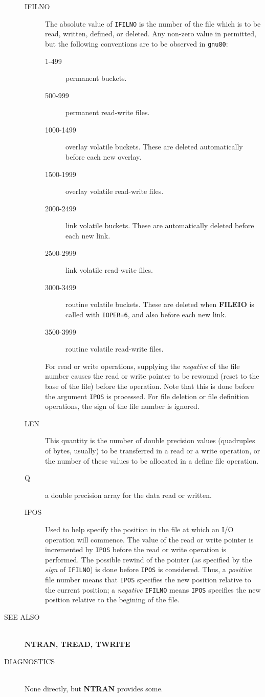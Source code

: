 \begin{description}
\begin{description}
\item[IFILNO] The absolute value of {\tt IFILNO} is the number  of  the  file
which is to be read, written, defined, or deleted.  Any
non-zero value in permitted, but the following  
conventions are to be observed in {\tt gnu80}:
\begin{description} 
\item[1-499]  permanent buckets.
\item[500-999] permanent read-write files.
\item[1000-1499]  overlay volatile buckets.  These are  
deleted automatically before each new overlay.
\item[1500-1999]  overlay volatile read-write files.
\item[2000-2499]  link volatile buckets.  These  are  
automatically deleted before each new link.
\item[2500-2999]  link volatile read-write files.
\item[3000-3499]  routine volatile buckets.  These are  
deleted when {\bf FILEIO} is called with {\tt IOPER=6},
and also before each new link.
\item[3500-3999]  routine volatile read-write files.
\end{description} 
For read or write operations, supplying the {\em negative}
of  the  file number causes the read or write 
pointer to be rewound (reset to the base of the file) 
before  the operation. Note that this is done before the
argument {\tt IPOS} is processed.  For file deletion or file
definition operations, the sign of the file number is
ignored.
\item[LEN]   This quantity is the number of double precision values
(quadruples of bytes, usually)  to be transferred in a read or a write 
operation, or the number of these values to be allocated
in a define file operation.
\item[Q] a double precision array for the data read or written.
\item[IPOS] Used to help specify the position in the   file
at  which  an I/O operation will commence. The value of
the read or write pointer is incremented by {\tt IPOS} before
the read or write operation is performed. The possible
rewind of the pointer (as specified by  the  {\em sign}  of
{\tt IFILNO}) is done before {\tt IPOS} is considered.  Thus, a 
{\em positive} file number means that {\tt IPOS} specifies  the  new
position relative to the current position; a {\em negative}
{\tt IFILNO} means {\tt IPOS} specifies the new  position relative
to the begining of the file.
\end{description}
\item[SEE ALSO] \ \\
{\bf NTRAN, TREAD, TWRITE}
\item[DIAGNOSTICS] \ \\
None directly, but {\bf NTRAN} provides some.
\end{description}
